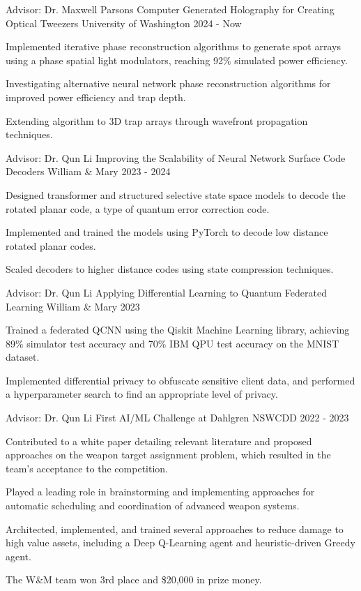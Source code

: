 
\begin{cventries}
\cventry
{Advisor: Dr. Maxwell Parsons}
{Computer Generated Holography for Creating Optical Tweezers}
{University of Washington}
{2024 - Now}
{{\begin{cvitems}
\item Implemented iterative phase reconstruction algorithms to generate spot arrays using a phase spatial light modulators, reaching 92\% simulated power efficiency.
\item Investigating alternative neural network phase reconstruction algorithms for improved power efficiency and trap depth.
\item Extending algorithm to 3D trap arrays through wavefront propagation techniques.
\end{cvitems}
}}

\cventry
{Advisor: Dr. Qun Li}
{Improving the Scalability of Neural Network Surface Code Decoders}
{William \& Mary}
{2023 - 2024}
{{\begin{cvitems}
\item Designed transformer and structured selective state space models to decode the rotated planar code, a type of quantum error correction code.
\item Implemented and trained the models using PyTorch to decode low distance rotated planar codes.
\item Scaled decoders to higher distance codes using state compression techniques.
\end{cvitems}
}}

\cventry
{Advisor: Dr. Qun Li}
{Applying Differential Learning to Quantum Federated Learning}
{William \& Mary}
{2023}
{{\begin{cvitems}
\item Trained a federated QCNN using the Qiskit Machine Learning library, achieving 89\% simulator test accuracy and 70\% IBM QPU test accuracy on the MNIST dataset.
\item Implemented differential privacy to obfuscate sensitive client data, and performed a hyperparameter search to find an appropriate level of privacy. 
\end{cvitems}
}}

\cventry
{Advisor: Dr. Qun Li}
{First AI/ML Challenge at Dahlgren}
{NSWCDD}
{2022 - 2023}
{{\begin{cvitems}
\item Contributed to a white paper detailing relevant literature and proposed approaches on the weapon target assignment problem, which resulted in the team's acceptance to the competition.
\item Played a leading role in brainstorming and implementing approaches for automatic scheduling and coordination of advanced weapon systems.
\item Architected, implemented, and trained several approaches to reduce damage to high value assets, including a Deep Q-Learning agent and heuristic-driven Greedy agent.
\item The W\&M team won 3rd place and \$20,000 in prize money. 
\end{cvitems}
}}


\end{cventries}
